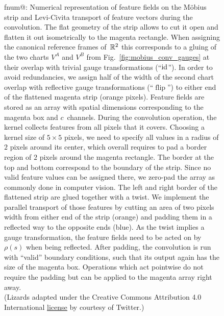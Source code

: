 \begin{figure}
        {\protect{}}%
    \small %
    \csname fnum@\@captype\endcsname: %
    \makeatother
        Numerical representation of feature fields on the M\"obius strip and Levi-Civita transport of feature vectors during the convolution.
        The flat geometry of the strip allows to cut it open and flatten it out isometrically to the magenta rectangle.
        When assigning the canonical reference frames of~$\mathbb{R}^2$ this corresponds to a gluing of the two charts $V^A$ and $V^B$ from Fig.~\ref{fig:mobius_conv_gauges} at their overlap with trivial gauge transformations (``$\mathrm{id}$'').
        In order to avoid redundancies, we assign half of the width of the second chart overlap with reflective gauge transformations (``$\operatorname{flip}$'') to either end of the flattened magenta strip (orange pixels).
        Feature fields are stored as an array with spatial dimensions corresponding to the magenta box and $c$~channels.
        During the convolution operation, the kernel collects features from all pixels that it covers.
        Choosing a kernel size of $5\times5$ pixels, we need to specify all values in a radius of $2$ pixels around its center, which overall requires to pad a border region of $2$ pixels around the magenta rectangle.
        The border at the top and bottom correspond to the boundary of the strip.
        Since no valid feature values can be assigned there, we zero-pad the array as commonly done in computer vision.
        The left and right border of the flattened strip are glued together with a twist.
        We implement the parallel transport of those features by cutting an area of two pixels width from either end of the strip (orange) and padding them in a reflected way to the opposite ends (blue).
        As the twist implies a gauge transformation, the feature fields need to be acted on by $\rho(s)$ when being reflected.
        After padding, the convolution is run with ``valid'' boundary conditions, such that its output again has the size of the magenta box.
        Operations which act pointwise do not require the padding but can be applied to the magenta array right away.
        {
        \\ \color{gray} \scriptsize
            (Lizards adapted under the Creative Commons Attribution 4.0 International
            \href{https://github.com/twitter/twemoji/blob/gh-pages/LICENSE-GRAPHICS}{\underline{license}}
            by courtesy of Twitter.)
        }
    \label{fig:mobius_conv_numerical}
\end{figure}

